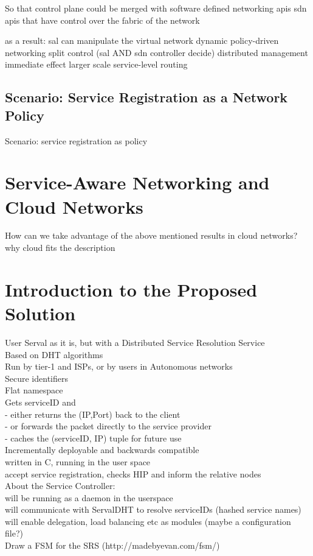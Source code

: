 \documentclass[12pt,a4paper,oneside]{article}
\begin{document}
So that control plane could be merged with software defined networking apis
sdn apis that have control over the fabric of the network

as a result: sal can manipulate the virtual network
dynamic policy-driven networking
split control (sal AND sdn controller decide)
distributed management
immediate effect
larger scale service-level routing

\subsection{Scenario: Service Registration as a Network Policy}
Scenario:
service registration as policy

\newpage
\section{Service-Aware Networking and Cloud Networks}
How can we take advantage of the above mentioned results in cloud networks?
why cloud fits the description

\newpage
\section{Introduction to the Proposed Solution}
User Serval as it is, but with a Distributed Service Resolution Service
\\Based on DHT algorithms
\\Run by tier-1 and ISPs, or by users in Autonomous networks
\\Secure identifiers
\\Flat namespace
\\Gets serviceID and
\\- either returns the (IP,Port) back to the client
\\- or forwards the packet directly to the service provider
\\- caches the (serviceID, IP) tuple for future use
\\Incrementally deployable and backwards compatible
\\written in C, running in the user space
\\accept service registration, checks HIP and inform the relative nodes
\\About the Service Controller:
\\will be running as a daemon in the userspace
\\will communicate with ServalDHT to resolve serviceIDs (hashed service names)
\\will enable delegation, load balancing etc as modules (maybe a configuration file?)
\\Draw a FSM for the SRS  (http://madebyevan.com/fsm/)
\end{document}
